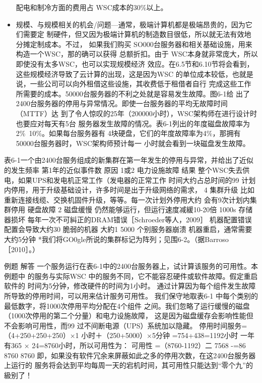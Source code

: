\begin{itemize}
    配电和制冷方面的费用占 WSC成本的30\%以上。
    \item 规模、与规模相关的机会/问题—通常，极端计算机都是极端昂贵的，因为它们需要定
    制硬件，但又因为极端计算机的制造数目很低，所以就无法有效地分摊定制成本。不过，
    如果我们购买 SO000台服务器和相关基础设施，用来构造一个WSC，那的确可以获得
    总额折扣。由于 WSC本身就非常庞大，所以即使没有太多WSC，也可以实现规模经济
    效应。在6.5节和6.10节将会看到，这些规模经济导致了云计算的出现，这是因为WSC
    的单位成本较低，也就是说，一些公司可以向外租借这些设施，其收费低于租借者自行
    完成这些工作所需要的成本。50000台服务器的不利之处就是容易发生故障。图6-1给
    出了2400台服务器的停用与异常情况。即使一台服务器的平均无故障时间（MTTF）达
    到了令人惊叹的25年（200000小时），WSC架构师在进行设计时也要应对每天有5台
    服务器发生故障的情况。表6-1列出的年度磁盘故障率为2\%~10\%。如果每台服务器有
    4块硬盘，它们的年度故障率为4\%，那拥有50000台服务器时，WSC架构师预计每一
    小时就会看到一块磁盘发生故障。
\end{itemize}
表6-1一个由2400台服务组成的新集群在第一年发生的停用与异常，并给出了近似的发生频率
第1年的近似事件数
原因
1或2
电力设施故障
结果
整个WSC失去供电，如果UPS和发电机正常工作（发电器的正常工作
时间大约占总时间的99%
计划内停用，用于升级基础设计，许多时间是出于升级网络的需求，
4
集群升级
比如重新连接线缆、交换机固件升级，等等。每一次计划外停用大约
会有9次计划内集群停用
硬盘故障
2%
磁盘缓慢
仍然能够运行，但运行速度减緩10-20倍
1000s
存储器损坏
每年一次不可糾正的DRAM错误［Schroeder等人，2009］
机器配置错误
配置会导致大约30%
脆弱的机器
大約1%
5000
个别服务器崩溃
机器重启，通常需要大约5分钟
*我们将GO0gle所说的集群标记为阵列；见围6-2。（据Barroso ［2010］。）

例题
解答
一个服务运行在表6-1中的2400台服务器上，试计算该服务的可用性。本例题中
的服务与实际WSC 中的服务不同，它不能容忍硬件或软件故障。假定重启软件的
时间为5分钟，修改硬件的时间为1小时。
通过计算因为每个组件发生故障所导致的停用时间，可以用来估计服务可用性。
我们保守地取表6-1 中每个类别的最低数字，将1000次停用平均分配在4个组件
之间。我们忽略了运行缓慢的磁盘（1000次停用的第二个分量）和电力设施故障，
这是因为磁盘缓存会影响性能但不会影响可用性，而99%
过不间断电源（UPS）系统加以隐藏。
停用时间服务=（4+250+250+250）×1 小时＋（250+5000）×5分钟
=754+438=1192小时
一年有365 × 24=8760小时，所以可用性为：
可用性 =（8760-1192）二
7568
-=86%
8760
8760
即，如果没有软件冗余来屏蔽如此之多的停用次数，在这2400台服务器上运行的
服务将会达到平均每周一天的宕机时间，其可用性只能达到“零个九”的級别了！

